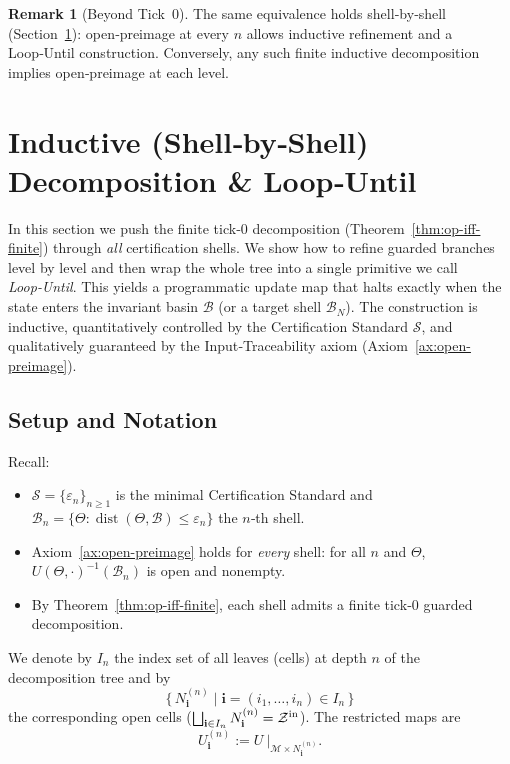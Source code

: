 \documentclass[12pt]{article}
\theoremstyle{definition}
\newtheorem{remark}{Remark}[section]
\theoremstyle{plain}
\begin{document}
\begin{remark}[Beyond Tick 0]
The same equivalence holds shell‑by‑shell (Section~\ref{sec:inductive-shell-loop}): open‑preimage at every $n$ allows inductive refinement and a Loop‑Until construction.  Conversely, any such finite inductive decomposition implies open‑preimage at each level.

\end{remark}

\section{Inductive (Shell‑by‑Shell) Decomposition \& Loop‑Until}
\label{sec:inductive-shell-loop}

In this section we push the finite tick‑0 decomposition (Theorem~\ref{thm:op-iff-finite}) through \emph{all} certification shells.  We show how to refine guarded branches level by level and then wrap the whole tree into a single primitive we call \emph{Loop‑Until}.  This yields a programmatic update map that halts exactly when the state enters the invariant basin $\mathcal B$ (or a target shell $\mathcal B_N$).  The construction is inductive, quantitatively controlled by the Certification Standard $\mathcal S$, and qualitatively guaranteed by the Input‑Traceability axiom (Axiom~\ref{ax:open-preimage}).

\subsection{Setup and Notation}
\label{subsec:inductive-setup}

Recall:
\begin{itemize}
  \item $\mathcal S=\{\varepsilon_n\}_{n\ge1}$ is the minimal Certification Standard and
        $\mathcal B_n=\{\Theta:\operatorname{dist}(\Theta,\mathcal B)\le\varepsilon_n\}$ the $n$‑th shell.
  \item Axiom~\ref{ax:open-preimage} holds for \emph{every} shell: for all $n$ and $\Theta$,
        $U(\Theta,\cdot)^{-1}(\mathcal B_n)$ is open and nonempty.
  \item By Theorem~\ref{thm:op-iff-finite}, each shell admits a finite tick‑0 guarded decomposition.
\end{itemize}

We denote by $I_n$ the index set of all leaves (cells) at depth $n$ of the decomposition tree and by
\[
  \{\,N^{(n)}_{\mathbf i}\mid \mathbf i=(i_1,\dots,i_n)\in I_n\,\}
\]
the corresponding open cells ($\bigsqcup_{\mathbf i\in I_n} N^{(n)}_{\mathbf i}=\mathcal Z^{\rm in}$).  The restricted maps are
\[
  U^{(n)}_{\mathbf i}
  := U\ \big|_{\mathcal M\times N^{(n)}_{\mathbf i}}.
\]
\end{document}
